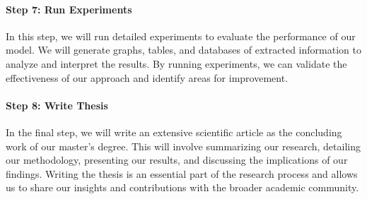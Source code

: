 \documentclass[a4paper,11pt]{article}
\begin{document}
\paragraph{Step 7: Run Experiments}
In this step, we will run detailed experiments to evaluate the performance of
our model. We will generate graphs, tables, and databases of extracted
information to analyze and interpret the results. By running experiments, we
can validate the effectiveness of our approach and identify areas for
improvement.


\paragraph{Step 8: Write Thesis}
In the final step, we will write an extensive scientific article as the
concluding work of our master's degree. This will involve summarizing our
research, detailing our methodology, presenting our results, and discussing the
implications of our findings. Writing the thesis is an essential part of the
research process and allows us to share our insights and contributions with the
broader academic community.



\end{document}
